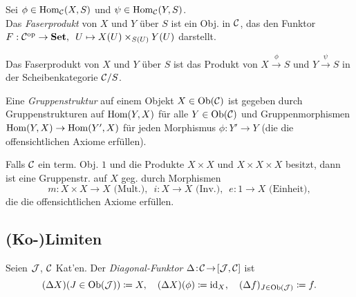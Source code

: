 \documentclass{cheat-sheet}
\begin{document}
\begin{defn}
  Sei $\phi \in \operatorname{Hom}_{\mathcal{C}}(X, S)$ und $\psi \in \operatorname{Hom}_{\mathcal{C}}(Y, S)$. \\
  Das \emph{Faserprodukt} von $X$ und $Y$ über $S$ ist ein Obj. in $\mathcal{C}$, das den Funktor
  $F : \mathcal{C}^{\mathrm{op}} \to \mathbf{Set}, \enspace U \mapsto X(U) \times_{S(U)} Y(U)$ darstellt.
\end{defn}

\begin{bem}
  Das Faserprodukt von $X$ und $Y$ über $S$ ist das Produkt von $X \xrightarrow{\phi} S$ und $Y \xrightarrow{\psi} S$ in der Scheibenkategorie $\mathcal{C}/S$.
\end{bem}


\begin{defn}
  Eine \emph{Gruppenstruktur} auf einem Objekt $X \in \operatorname{Ob}(\mathcal{C})$ ist gegeben durch Gruppenstrukturen auf $\operatorname{Hom}(Y, X)$ für alle $Y \in \operatorname{Ob}(\mathcal{C})$ und Gruppenmorphismen $\operatorname{Hom}(Y, X) \to \operatorname{Hom}(Y', X)$ für jeden Morphismus $\phi : Y' \to Y$ (die die offensichtlichen Axiome erfüllen).
\end{defn}

\begin{bem}
  Falls $\mathcal{C}$ ein term. Obj. $1$ und die Produkte $X \!\times\! X$ und $X \!\times\! X \!\times\! X$ besitzt, dann ist eine Gruppenstr. auf $X$ geg. durch Morphismen
  \[
    m : X \times X \to X \text{ (Mult.)}, \enspace
    i : X \to X \text{ (Inv.)}, \enspace
    e : 1 \to X \text{ (Einheit)},
  \]
  die die offensichtlichen Axiome erfüllen.
\end{bem}

\columnbreak


\subsection{(Ko-)Limiten}


\begin{defn}
  Seien $\mathcal{J}$, $\mathcal{C}$ Kat'en.
  Der \emph{Diagonal-Funktor} $\Delta \!:\! \mathcal{C} \!\to\! [\mathcal{J}, \mathcal{C}]$ ist
  \[
    (\Delta X)(J \in \operatorname{Ob}(\mathcal{J})) \coloneqq X, \quad
    (\Delta X)(\phi) \coloneqq \operatorname{id}_X, \quad
    (\Delta f)_{J \in \operatorname{Ob}(\mathcal{J})} \coloneqq f.
  \]
\end{defn}
\end{document}
